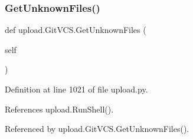 \subsubsection{\texorpdfstring{Get\+Unknown\+Files()}{GetUnknownFiles()}\hspace{0.1cm}{\footnotesize\ttfamily [1/2]}}
{\footnotesize\ttfamily def upload.\+Git\+V\+C\+S.\+Get\+Unknown\+Files (\begin{DoxyParamCaption}\item[{}]{self }\end{DoxyParamCaption})}



Definition at line 1021 of file upload.\+py.



References upload.\+Run\+Shell().



Referenced by upload.\+Git\+V\+C\+S.\+Get\+Unknown\+Files().


